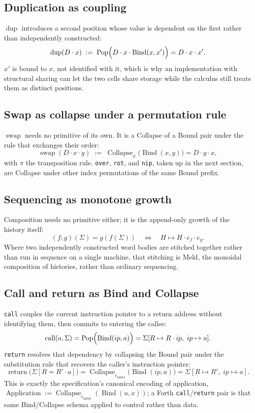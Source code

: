 \documentclass[12pt]{article}
\begin{document}
\subsection*{Duplication as coupling}
\(\operatorname{dup}\) introduces a second position whose value is dependent on the first rather than independently constructed:
\[
\operatorname{dup}(D\cdot x) \;:=\; \operatorname{Pop}\Bigl(D\cdot x\cdot \operatorname{Bind}(x,x')\Bigr) = D\cdot x\cdot x'.
\]
\(x'\) is bound to \(x\), not identified with it, which is why an implementation with structural sharing can let the two cells share storage while the calculus still treats them as distinct positions.

\subsection*{Swap as collapse under a permutation rule}
\(\operatorname{swap}\) needs no primitive of its own. It is a Collapse of a Bound pair under the rule that exchanges their order:
\[
\operatorname{swap}(D\cdot x\cdot y) \;:=\; \operatorname{Collapse}_{\pi}\bigl(\operatorname{Bind}(x,y)\bigr) = D\cdot y\cdot x,
\]
with \(\pi\) the transposition rule. \texttt{over}, \texttt{rot}, and \texttt{nip}, taken up in the next section, are Collapse under other index permutations of the same Bound prefix.

\subsection*{Sequencing as monotone growth}
Composition needs no primitive either; it is the append-only growth of the history itself:
\[
(f;g)(\Sigma)=g(f(\Sigma)) \quad\Longleftrightarrow\quad H \mapsto H\cdot e_f\cdot e_g.
\]
Where two independently constructed word bodies are stitched together rather than run in sequence on a single machine, that stitching is Meld, the monoidal composition of histories, rather than ordinary sequencing.

\subsection*{Call and return as Bind and Collapse}
\texttt{call} couples the current instruction pointer to a return address without identifying them, then commits to entering the callee:
\[
\operatorname{call}(a,\Sigma) = \operatorname{Pop}\Bigl(\operatorname{Bind}(ip,a)\Bigr) = \Sigma[R \mapsto R\cdot ip,\; ip\mapsto a].
\]
\texttt{return} resolves that dependency by collapsing the Bound pair under the substitution rule that recovers the caller's instruction pointer:
\[
\operatorname{return}\bigl(\Sigma[R=R'\cdot a]\bigr) = \operatorname{Collapse}_{c_{\mathrm{subst}}}\bigl(\operatorname{Bind}(ip,a)\bigr) = \Sigma[R\mapsto R',\;ip\mapsto a].
\]
This is exactly the specification's canonical encoding of application, \(\operatorname{Application} := \operatorname{Collapse}_{c_{\mathrm{subst}}}(\operatorname{Bind}(u,x))\); a Forth \texttt{call}/\texttt{return} pair is that same Bind/Collapse schema applied to control rather than data.
\end{document}
